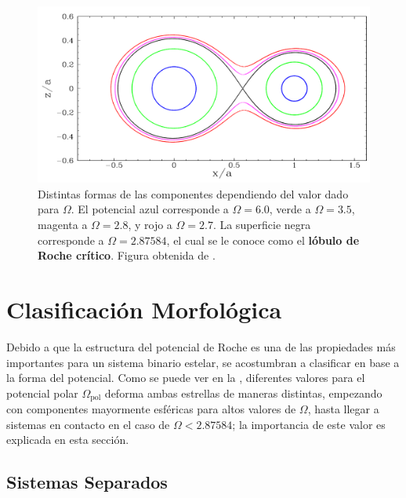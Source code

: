 \begin{figure}[!ht]
	\centering
	\includegraphics[scale=0.4]{Introduccion/Figures/Figura Forma Roche_PHOEBE Reference.png}
	\caption{Distintas formas de las componentes dependiendo del valor dado para $\Omega$. El potencial azul corresponde a $\Omega = 6.0$, verde a $\Omega = 3.5$, magenta a $\Omega = 2.8$, y rojo a $\Omega = 2.7$. La superficie negra corresponde a $\Omega = 2.87584$, el cual se le conoce como el \textbf{lóbulo de Roche crítico}. Figura obtenida de .}
	\label{figuraRocheFormaPhoebe}
\end{figure}

\section{Clasificación Morfológica}

Debido a que la estructura del potencial de Roche es una de las propiedades más
importantes para un sistema binario estelar, se acostumbran a clasificar en base
a la forma del potencial. Como se puede ver en la
, diferentes valores para el potencial polar
$\Omega_{\mathrm{pol}}$ deforma ambas estrellas de maneras distintas, empezando
con componentes mayormente esféricas para altos valores de $\Omega$, hasta
llegar a sistemas en contacto en el caso de $\Omega < 2.87584$; la importancia
de este valor es explicada en esta sección.

\subsection{Sistemas Separados}

